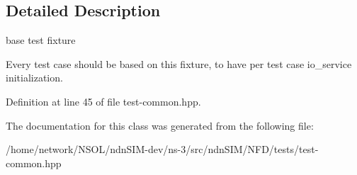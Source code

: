 \subsection{Detailed Description}
base test fixture 

Every test case should be based on this fixture, to have per test case io\+\_\+service initialization. 

Definition at line 45 of file test-\/common.\+hpp.



The documentation for this class was generated from the following file\+:\begin{DoxyCompactItemize}
\item 
/home/network/\+N\+S\+O\+L/ndn\+S\+I\+M-\/dev/ns-\/3/src/ndn\+S\+I\+M/\+N\+F\+D/tests/test-\/common.\+hpp\end{DoxyCompactItemize}
